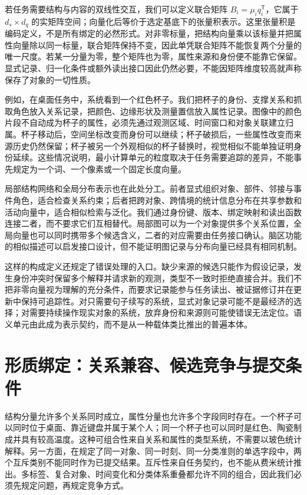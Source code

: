 若任务需要结构与内容的双线性交互，我们可以定义联合矩阵 $B_i=\mu_iq_i^{\mathsf T}$，它属于 $d_s\times d_q$ 的实矩阵空间；向量化后等价于选定基底下的张量积表示。这里张量积是编码定义，不是所有绑定的必然形式。对非零标量，把结构向量乘以该标量并把属性向量除以同一标量，联合矩阵保持不变，因此单凭联合矩阵不能恢复两个分量的唯一尺度。若某一分量为零，整个矩阵也为零，属性来源和身份便不能靠它保留。显式记录、归一化条件或额外读出接口因此仍然必要，不能因矩阵维度较高就声称保存了对象的一切性质。

例如，在桌面任务中，系统看到一个红色杯子。我们把杯子的身份、支撑关系和抓取角色放入关系记录，把颜色、边缘形状及测量置信放入属性记录。图像中的颜色片段不自动成为杯子的属性，必须先通过观测区域、时间窗口和对象关联建立归属。杯子移动后，空间坐标改变而身份可以继续；杯子破损后，一些属性改变而来源历史仍然保留；杯子被另一个外观相似的杯子替换时，视觉相似不能单独证明身份延续。这些情况说明，最小计算单元的粒度取决于任务需要追踪的差异，不能事先规定为一个词、一个像素或一个固定长度向量。

局部结构网络和全局分布表示也在此处分工。前者显式组织对象、部件、邻接与事件角色，适合检查关系约束；后者把跨对象、跨情境的统计信息分布在共享参数和活动向量中，适合相似检索与泛化。我们通过身份键、版本、绑定映射和读出函数连接二者，而不要求它们互相替代。局部图可以为一个对象提供多个关系位置，全局向量也可以同时携带多个候选含义，二者的对应需要由任务接口确认。脑区功能的相似描述可以启发接口设计，但不能证明图记录与分布向量已经具有相同机制。

这样的构成定义还规定了错误处理的入口。缺少来源的候选只能作为假设记录，发生身份冲突时保留多个解释并请求新的观测，类型不一致时拒绝直接合并。我们不把非零向量视为理解的充分条件，而要求记录能参与任务读出、被证据修订并在更新中保持可追踪性。对只需要句子续写的系统，显式对象记录可能不是最经济的选择；对需要持续操作现实对象的系统，放弃身份和来源则可能使错误无法定位。语义单元由此成为表示契约，而不是从一种载体类比推出的普遍本体。

\section{形质绑定：关系兼容、候选竞争与提交条件}
\label{sec:section_5143}
\label{sec:section_8945}

结构分量允许多个关系同时成立，属性分量也允许多个字段同时存在。一个杯子可以同时位于桌面、靠近键盘并属于某个人；同一个杯子也可以同时是红色、陶瓷制成并具有较高温度。这种可组合性来自关系和属性的类型系统，不需要以玻色统计解释。另一方面，在规定了同一对象、同一时刻、同一分类准则的单选字段中，两个互斥类别不能同时作为已提交结果。互斥性来自任务契约，也不能从费米统计推出。多标签、复合对象、时间变化和分类体系重叠都允许不同的组合，因此我们必须先规定问题，再规定竞争方式。

